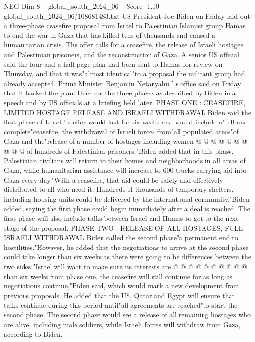 \begin{textsample}{NEG Dim 8 – global\_south\_2024\_06 – Score -1.00 – global\_south\_2024\_06/108681483.txt}  \label{ex:f8_neg_046}
US President Joe Biden on Friday laid out a three-phase ceasefire proposal from Israel to Palestinian Islamist group Hamas to end the war in Gaza that has killed tens of thousands and caused a humanitarian crisis.
The offer calls for a ceasefire, the release of Israeli hostages and Palestinian prisoners, and the reconstruction of Gaza.
A senior US official said the four-and-a-half page plan had been sent to Hamas for review on Thursday, and that it was"almost identical"to a proposal the militant group had already accepted.
Prime Minister Benjamin Netanyahu ' s office said on Friday that it backed the plan.
Here are the three phases as described by Biden in a speech and by US officials at a briefing held later.
PHASE ONE : CEASEFIRE, LIMITED HOSTAGE RELEASE AND ISRAELI WITHDRAWAL Biden said the first phase of Israel ' s offer would last for six weeks and would include a"full and complete"ceasefire, the withdrawal of Israeli forces from"all populated areas"of Gaza and the"release of a number of hostages including women @ @ @ @ @ @ @ @ @ @ of hundreds of Palestinian prisoners."Biden added that in this phase, Palestinian civilians will return to their homes and neighborhoods in all areas of Gaza, while humanitarian assistance will increase to 600 trucks carrying aid into Gaza every day."With a ceasefire, that aid could be safely and effectively distributed to all who need it.
Hundreds of thousands of temporary shelters, including housing units could be delivered by the international community,"Biden added, saying the first phase could begin immediately after a deal is reached.
The first phase will also include talks between Israel and Hamas to get to the next stage of the proposal.
PHASE TWO : RELEASE OF ALL HOSTAGES, FULL ISRAELI WITHDRAWAL Biden called the second phase"a permanent end to hostilities."However, he added that the negotiations to arrive at the second phase could take longer than six weeks as there were going to be differences between the two sides."Israel will want to make sure its interests are @ @ @ @ @ @ @ @ @ @ than six weeks from phase one, the ceasefire will still continue for as long as negotiations continue,"Biden said, which would mark a new development from previous proposals.
He added that the US, Qatar and Egypt will ensure that talks continue during this period until"all agreements are reached"to start the second phase.
The second phase would see a release of all remaining hostages who are alive, including male soldiers, while Israeli forces will withdraw from Gaza, according to Biden.

\end{textsample}
